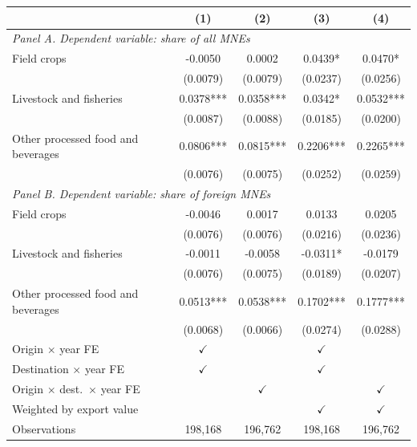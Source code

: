 \begin{tabular}{lcccc} \hline
 & (1) & (2) & (3) & (4) \\ \hline
\multicolumn{5}{l}{\textit{Panel A. Dependent variable: share of all MNEs}} \\
Field crops & -0.0050 & 0.0002 & 0.0439* & 0.0470* \\
 & (0.0079) & (0.0079) & (0.0237) & (0.0256) \\
Livestock and fisheries & 0.0378*** & 0.0358*** & 0.0342* & 0.0532*** \\
 & (0.0087) & (0.0088) & (0.0185) & (0.0200) \\
Other processed food and beverages & 0.0806*** & 0.0815*** & 0.2206*** & 0.2265*** \\
 & (0.0076) & (0.0075) & (0.0252) & (0.0259) \\
\midrule
\multicolumn{5}{l}{\textit{Panel B. Dependent variable: share of foreign MNEs}} \\
Field crops & -0.0046 & 0.0017 & 0.0133 & 0.0205 \\
 & (0.0076) & (0.0076) & (0.0216) & (0.0236) \\
Livestock and fisheries & -0.0011 & -0.0058 & -0.0311* & -0.0179 \\
 & (0.0076) & (0.0075) & (0.0189) & (0.0207) \\
Other processed food and beverages & 0.0513*** & 0.0538*** & 0.1702*** & 0.1777*** \\
 & (0.0068) & (0.0066) & (0.0274) & (0.0288) \\
\hline
Origin $\times$ year FE & $\checkmark$ & & $\checkmark$ & \\
Destination $\times$ year FE & $\checkmark$ & & $\checkmark$ & \\
Origin $\times$ dest.\ $\times$ year FE & & $\checkmark$ & & $\checkmark$ \\
Weighted by export value & & & $\checkmark$ & $\checkmark$ \\
Observations & 198,168 & 196,762 & 198,168 & 196,762 \\
\hline
\end{tabular}
